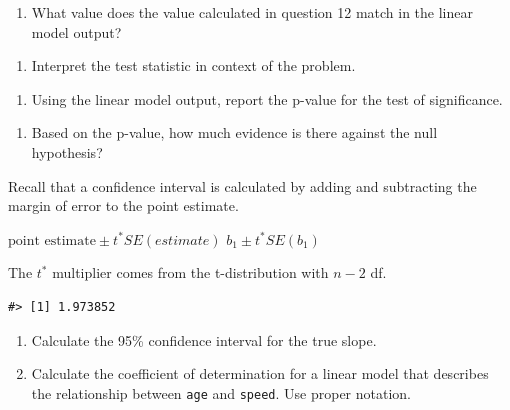 \documentclass[
]{report}
\providecommand{\tightlist}{%
  \setlength{\itemsep}{0pt}\setlength{\parskip}{0pt}}
\begin{document}
\begin{enumerate}
\def\labelenumi{\arabic{enumi}.}
\setcounter{enumi}{12}
\tightlist
\item
  What value does the value calculated in question 12 match in the linear model output?
\end{enumerate}

\vspace{0.5in}

\begin{enumerate}
\def\labelenumi{\arabic{enumi}.}
\setcounter{enumi}{13}
\tightlist
\item
  Interpret the test statistic in context of the problem.
\end{enumerate}

\vspace{1in}

\begin{enumerate}
\def\labelenumi{\arabic{enumi}.}
\setcounter{enumi}{14}
\tightlist
\item
  Using the linear model output, report the p-value for the test of significance.
\end{enumerate}

\vspace{0.5in}

\begin{enumerate}
\def\labelenumi{\arabic{enumi}.}
\setcounter{enumi}{15}
\tightlist
\item
  Based on the p-value, how much evidence is there against the null hypothesis?
\end{enumerate}

\vspace{0.5in}

Recall that a confidence interval is calculated by adding and subtracting the margin of error to the point estimate.

\(\mbox{point estimate}\pm t^*SE(estimate)\)
\(b_1 \pm t^* SE(b_1)\)

The \(t^*\) multiplier comes from the t-distribution with \(n-2\) df.

\begin{verbatim}
#> [1] 1.973852
\end{verbatim}

\begin{enumerate}
\def\labelenumi{\arabic{enumi}.}
\setcounter{enumi}{16}
\item
  Calculate the 95\% confidence interval for the true slope.
  \vspace{1in}
\item
  Calculate the coefficient of determination for a linear model that describes the relationship between \texttt{age} and \texttt{speed}. Use proper notation.
\end{enumerate}
\end{document}
